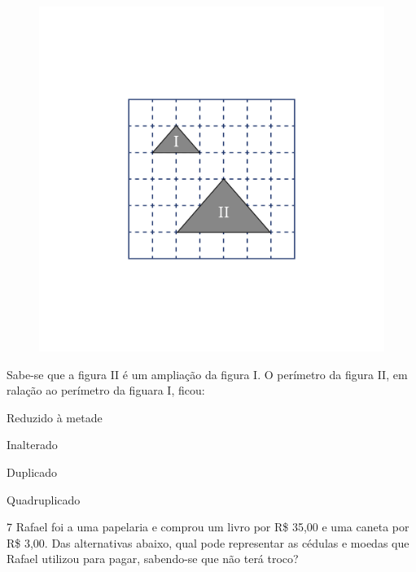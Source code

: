 \begin{figure}[htpb!]
\includegraphics[width=\textwidth]{../ilustracoes/MAT5/SAEB_5ANO_MAT_figura125.png}
\end{figure}

Sabe-se que a figura II é um ampliação da figura I. O perímetro da
figura II, em ralação ao perímetro da figuara I, ficou:

\begin{escolha}
\item
  Reduzido à metade
\item
  Inalterado
\item
  Duplicado
\item
  Quadruplicado
\end{escolha}


\num{7} Rafael foi a uma papelaria e comprou um livro por R\$ 35,00 e uma
caneta por R\$ 3,00. Das alternativas abaixo, qual pode representar as
cédulas e moedas que Rafael utilizou para pagar, sabendo-se que não terá
troco?

